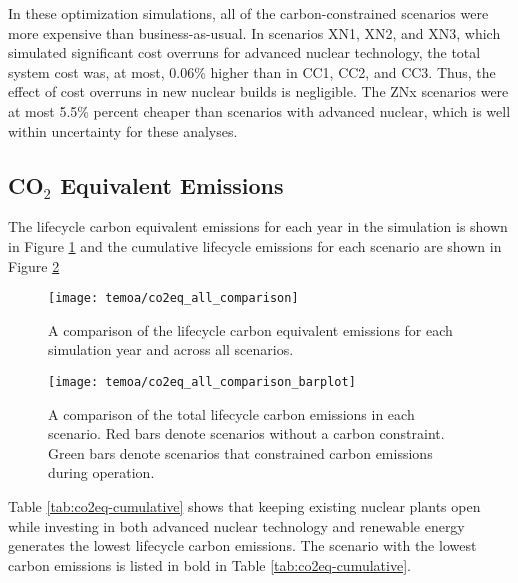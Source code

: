 In these optimization simulations, all of the carbon-constrained scenarios were 
more expensive than business-as-usual. In scenarios XN1, XN2, and XN3, which 
simulated significant cost overruns for advanced nuclear technology, the total 
system cost was, at most, 0.06\% higher than in CC1, CC2, and CC3. Thus, the 
effect of cost overruns in new nuclear builds is negligible. The ZNx scenarios 
were at most 5.5\% percent cheaper than scenarios with advanced nuclear, which 
is well within uncertainty for these analyses. 

\subsection{CO$_2$ Equivalent Emissions}

The lifecycle carbon equivalent emissions for each year in the simulation is
shown in Figure \ref{fig:co2eq-all} and the cumulative lifecycle emissions
for each scenario are shown in Figure \ref{fig:co2eq-cumulative}

\begin{figure}[H]
  \texttt{[image: temoa/co2eq\_all\_comparison]}
  \caption{A comparison of the lifecycle carbon equivalent emissions for
  each simulation year and across all scenarios.}
  \label{fig:co2eq-all}
\end{figure}

\begin{figure}[H]
  \texttt{[image: temoa/co2eq\_all\_comparison\_barplot]}
  \caption{A comparison of the total lifecycle carbon emissions in each
  scenario. Red bars denote scenarios without a carbon constraint. Green bars
  denote scenarios that constrained carbon emissions during operation.}
  \label{fig:co2eq-cumulative}
\end{figure}

Table \ref{tab:co2eq-cumulative} shows that keeping existing nuclear
plants open while investing in both advanced nuclear technology and renewable
energy generates the lowest lifecycle carbon emissions.
The scenario with the lowest carbon emissions is listed in bold in Table \ref{tab:co2eq-cumulative}.


